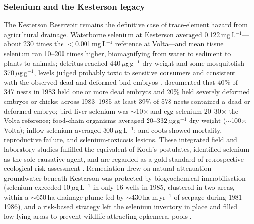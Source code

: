 \subsubsection{Selenium and the Kesterson legacy}
The Kesterson Reservoir remains the definitive case of trace-element hazard from agricultural drainage. Waterborne selenium at Kesterson averaged 0.122\,mg\,L$^{-1}$---about 230 times the $<$0.001\,mg\,L$^{-1}$ reference at Volta---and mean tissue selenium ran 10--200 times higher, biomagnifying from water to sediment to plants to animals; detritus reached 440\,$\mu$g\,g$^{-1}$ dry weight and some mosquitofish 370\,$\mu$g\,g$^{-1}$, levels judged probably toxic to sensitive consumers and consistent with the observed dead and deformed bird embryos \parencite{SAIKI1987}. \textcite{Ohlendorf2002} documented that 40\% of 347 nests in 1983 held one or more dead embryos and 20\% held severely deformed embryos or chicks; across 1983--1985 at least 39\% of 578 nests contained a dead or deformed embryo; bird-liver selenium was $\sim$10$\times$ and egg selenium 20--30$\times$ the Volta reference; food-chain organisms averaged 20--332\,$\mu$g\,g$^{-1}$ dry weight ($\sim$100$\times$ Volta); inflow selenium averaged 300\,$\mu$g\,L$^{-1}$; and coots showed mortality, reproductive failure, and selenium-toxicosis lesions. These integrated field and laboratory studies fulfilled the equivalent of Koch's postulates, identified selenium as the sole causative agent, and are regarded as a gold standard of retrospective ecological risk assessment \parencite{Ohlendorf2002}. Remediation drew on natural attenuation: groundwater beneath Kesterson was protected by biogeochemical immobilisation (selenium exceeded 10\,$\mu$g\,L$^{-1}$ in only 16 wells in 1985, clustered in two areas, within a $\sim$650\,ha drainage plume fed by $\sim$430\,ha-m\,yr$^{-1}$ of seepage during 1981--1986), and a risk-based strategy left the selenium inventory in place and filled low-lying areas to prevent wildlife-attracting ephemeral pools \parencite{BENSON1993}.

